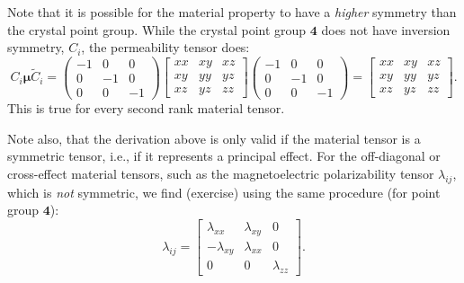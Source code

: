 Note that it is possible for the material property to have a \textit{higher} symmetry than the crystal point group.  While the crystal point group $\textbf{4}$ does not have inversion symmetry, $C_i$, the permeability tensor does:
{\small\begin{equation}
C_i\bm{\mu}\tilde{C}_i = \begin{pmatrix}-1&0&0\\ 0&-1&0\\ 0&0&-1\end{pmatrix}
	\begin{bmatrix}xx&xy&xz\\ xy&yy&yz\\ xz&yz&zz\end{bmatrix}\begin{pmatrix}-1&0&0\\ 0&-1&0\\ 0&0&-1\end{pmatrix} = 
	\begin{bmatrix}xx&xy&xz\\ xy&yy&yz\\ xz&yz&zz\end{bmatrix}.
\end{equation}}
This is true for every second rank material tensor.

Note also, that the derivation above is only valid if the material tensor is a symmetric tensor, i.e., if it represents a principal effect.   For the off-diagonal or cross-effect material tensors, such as the magnetoelectric polarizability tensor $\lambda_{ij}$, which is \textit{not} symmetric, we find (exercise) using the same procedure (for point group $\textbf{4}$):
\begin{equation}
	\lambda_{ij} =  \left[\begin{array}{ccc} 
	\lambda_{xx} & \lambda_{xy} & 0 \\ 
	-\lambda_{xy} &  \lambda_{xx} & 0 \\ 
	0 & 0 & \lambda_{zz}\end{array}\right].
\end{equation}


